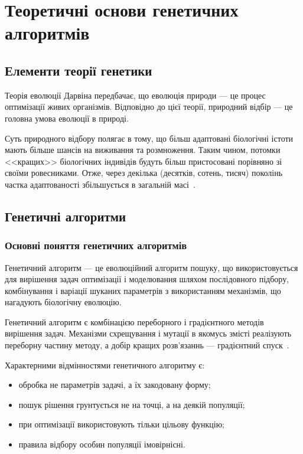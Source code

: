 %
%
\section{Теоретичні основи генетичних алгоритмів}
\subsection{Елементи теорії генетики}
Теорія еволюції Дарвіна передбачає, що еволюція природи --- це процес оптимізації живих організмів. Відповідно до цієї теорії, природний відбір --- це головна умова еволюції в природі.

Суть природного відбору полягає в тому, що більш адаптовані біологічні істоти мають більше шансів на виживання та розмноження. Таким чином, потомки <<кращих>> біологічних індивідів будуть більш пристосовані порівняно зі своїми ровесниками. Отже, через декілька (десятків, сотень, тисяч) поколінь частка адаптованості збільшується в загальній масі~\cite{evolutiontheory}.

%
%
\subsection{Генетичні алгоритми}
\subsubsection{Основні поняття генетичних алгоритмів}
Генетичний алгоритм --- це еволюційний алгоритм пошуку, що використовується для вирішення задач оптимізації і моделювання шляхом послідовного підбору, комбінування і варіації шуканих параметрів з використанням механізмів, що нагадують біологічну еволюцію.

Генетичний алгоритм є комбінацією переборного і градієнтного методів вирішення задач. Механізми схрещування і мутації в якомусь змісті реалізують переборну частину методу, а добір кращих розв’язаннь --- градієнтний спуск~\cite{neural_networks_and_ga}.

Характерними відмінностями генетичного алгоритму є:
\begin{itemize}
	\item обробка не параметрів задачі, а їх закодовану форму;
	\item пошук рішення грунтується не на точці, а на деякій популяції;
	\item при оптимізації використовують тільки цільову функцію;
	\item правила відбору особин популяції імовірнісні.
\end{itemize}

